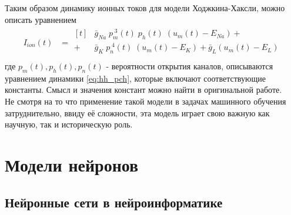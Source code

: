 \documentclass[a4paper,10pt]{article}
\begin{document}
	\indent Таким образом динамику ионных токов для модели Ходжкина-Хаксли, можно описать уравнением
	\begin{align}\label{eq:hh_ion}
	I_{ion}(t) &= \begin{aligned}[t]
	&\bar{g}_{Na}\;p_{m}^{\;3}(t)\;p_{h}(t)\;(u_{m}(t)-E_{Na}) +	\\
	+\;&\bar{g}_{K}\;p_{n}^{\;4}(t)\;(u_{m}(t)-E_{K})+\bar{g}_{L}(u_{m}(t)-E_{L})	\\
	\end{aligned}
	\end{align}
	где $p_{m}(t), p_{h}(t), p_{n}(t)$ - вероятности открытия каналов, описываются уравнением динамики \eqref{eq:hh_pch}, которые включают соответствующие константы. Смысл и значения констант можно найти в оригинальной работе\cite{HH}.\\
	\indent Не смотря на то что применение такой модели в задачах машинного обучения затруднительно, ввиду её сложности, эта модель играет свою важную как научную, так и историческую роль.

\section{Модели нейронов}
\subsection{Нейронные сети в нейроинформатике}
\end{document}
